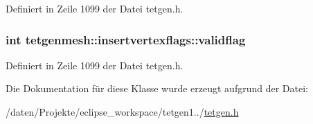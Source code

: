 Definiert in Zeile 1099 der Datei tetgen.\-h.

\hypertarget{classtetgenmesh_1_1insertvertexflags_a22ee846cb6922a83892692ed5a31c632}{
\subsubsection[{validflag}]{\setlength{\rightskip}{0pt plus 5cm}int tetgenmesh\-::insertvertexflags\-::validflag}}\label{classtetgenmesh_1_1insertvertexflags_a22ee846cb6922a83892692ed5a31c632}


Definiert in Zeile 1099 der Datei tetgen.\-h.



Die Dokumentation für diese Klasse wurde erzeugt aufgrund der Datei\-:\begin{DoxyCompactItemize}
\item 
/daten/\-Projekte/eclipse\-\_\-workspace/tetgen1../\hyperlink{tetgen_8h}{tetgen.\-h}\end{DoxyCompactItemize}
